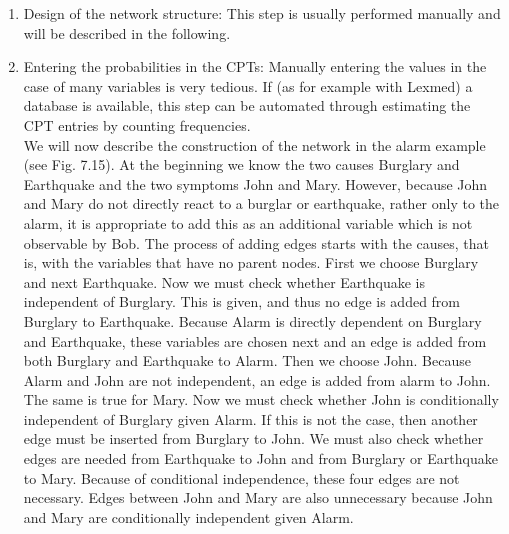 \documentclass[10pt]{book}
\begin{document}
\begin{enumerate}
  \item Design of the network structure: This step is usually performed manually and will be described in the following.
  \item Entering the probabilities in the CPTs: Manually entering the values in the case of many variables is very tedious. If (as for example with Lexmed) a database is available, this step can be automated through estimating the CPT entries by counting frequencies.\\
We will now describe the construction of the network in the alarm example (see Fig. 7.15). At the beginning we know the two causes Burglary and Earthquake and the two symptoms John and Mary. However, because John and Mary do not directly react to a burglar or earthquake, rather only to the alarm, it is appropriate to add this as an additional variable which is not observable by Bob. The process of adding edges starts with the causes, that is, with the variables that have no parent nodes. First we choose Burglary and next Earthquake. Now we must check whether Earthquake is independent of Burglary. This is given, and thus no edge is added from Burglary to Earthquake. Because Alarm is directly dependent on Burglary and Earthquake, these variables are chosen next and an edge is added from both Burglary and Earthquake to Alarm. Then we choose John. Because Alarm and John are not independent, an edge is added from alarm to John. The same is true for Mary. Now we must check whether John is conditionally independent of Burglary given Alarm. If this is not the case, then another edge must be inserted from Burglary to John. We must also check whether edges are needed from Earthquake to John and from Burglary or Earthquake to Mary. Because of conditional independence, these four edges are not necessary. Edges between John and Mary are also unnecessary because John and Mary are conditionally independent given Alarm.
\end{enumerate}
\end{document}

